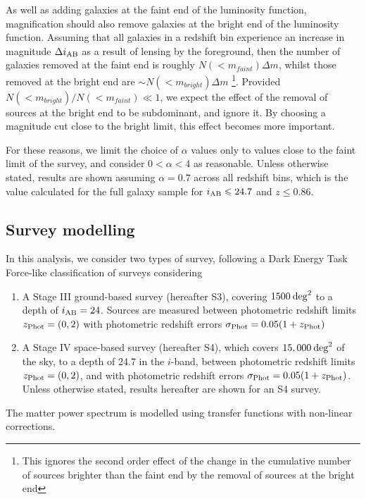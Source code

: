 \documentclass[useAMS,usenatbib,times,letter,amssymb]{mn2e}
\def\ATrue{0.7}
\begin{document}
As well as adding galaxies at the faint end of the luminosity function, magnification should also remove galaxies at the bright end of the luminosity function. Assuming that all galaxies in a redshift bin experience an increase in magnitude $\Delta i_{\rm AB}$ as a result of lensing by the foreground, then the number of galaxies removed at the faint end is roughly $N(<m_{faint})\Delta m$, whilst those removed at the bright end are $\sim N(<m_{bright})\Delta m$ \footnote{This ignores the second order effect of the change in the cumulative number of sources brighter than the faint end by the removal of sources at the bright end}. Provided $N(<m_{bright})/N(<m_{faint})\ll1$, we expect the effect of the removal of sources at the bright end to be subdominant, and ignore it. By choosing a magnitude cut close to the bright limit, this effect becomes more important. 

For these reasons, we limit the choice of $\alpha$ values only to values close to the faint limit of the survey, and consider $0<\alpha<4$ as reasonable. Unless otherwise stated, results are shown assuming $\alpha = \ATrue$ across all redshift bins, which is the value calculated for the full galaxy sample for $i_{\rm AB}\le 24.7$ and $z\le 0.86$.

\subsection{Survey modelling}\label{Sec:SurveyModelling}

In this analysis, we consider two types of survey, following a Dark Energy Task Force-like classification of surveys considering
\begin{enumerate}
\item{A Stage III ground-based survey (hereafter S3), covering $1500\:{\rm deg}^2$ to a depth of $i_{\rm AB} = 24$. Sources are measured between photometric redshift limits  $z_{\rm Phot} = (0,2)$ with photometric redshift errors $\sigma_{\rm Phot} = 0.05(1+z_{\rm Phot})$}
\item{A Stage IV space-based survey (hereafter S4), which covers $15,000 \:{\rm deg}^2$ of the sky, to a depth of 24.7 in the $i$-band, between photometric redshift limits $z_{\rm Phot} = (0,2)$, and with photometric redshift errors $\sigma_{\rm Phot} = 0.05(1+z_{\rm Phot})$. Unless otherwise stated, results hereafter are shown for an S4 survey.}
\end{enumerate}

The matter power spectrum is modelled using \cite{Eisenstein:1998p1135} transfer functions with \cite{Smith:2003p843} non-linear corrections.
\end{document}
